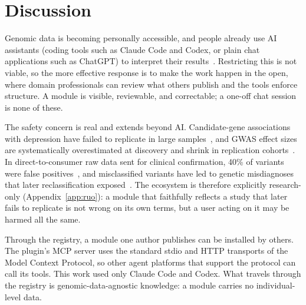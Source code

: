 \documentclass[11pt,a4paper]{article}
\begin{document}
\section{Discussion}

Genomic data is becoming personally accessible, and people already use AI
assistants (coding tools such as Claude Code and Codex, or plain chat
applications such as ChatGPT) to interpret their
results~\citep[e.g.,][]{conyngham2026rosie}. Restricting this is not viable, so the more
effective response is to make the work happen in the open, where domain
professionals can review what others publish and the tools enforce structure. A
module is visible, reviewable, and correctable; a one-off chat session is none
of these.

The safety concern is real and extends beyond AI. Candidate-gene
associations with depression have failed to replicate in large
samples~\citep{border2019no}, and GWAS effect sizes are systematically
overestimated at discovery and shrink in replication
cohorts~\citep{palmer2017winners}. In direct-to-consumer raw data sent for
clinical confirmation, 40\% of variants were false
positives~\citep{tandyconnor2018false}, and misclassified variants have led to
genetic misdiagnoses that later reclassification
exposed~\citep{manrai2016genetic}. The ecosystem is therefore explicitly
research-only (Appendix~\ref{app:ruo}): a module that faithfully reflects a study that later fails to
replicate is not wrong on its own terms, but a user acting on it may be harmed
all the same.

Through the registry, a module one author publishes can be installed by
others. The plugin's MCP server uses the standard stdio and HTTP transports of the
Model Context Protocol, so other agent platforms that support the protocol can
call its tools. This work used only Claude Code and Codex. What travels through the registry is genomic-data-agnostic knowledge:
a module carries no individual-level data.
\end{document}

